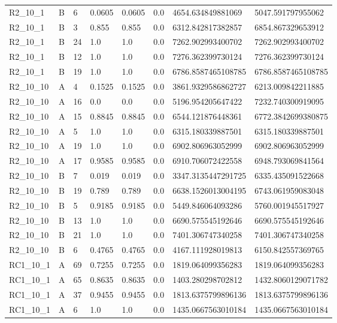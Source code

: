 \begin{tabular}{llllllll}
 R2\_10\_1 & B & 6 & 0.0605 & 0.0605 & 0.0 & 4654.634849881069 & 5047.591797955062 \\
 R2\_10\_1 & B & 3 & 0.855 & 0.855 & 0.0 & 6312.842817382857 & 6854.867329653912 \\
 R2\_10\_1 & B & 24 & 1.0 & 1.0 & 0.0 & 7262.902993400702 & 7262.902993400702 \\
 R2\_10\_1 & B & 12 & 1.0 & 1.0 & 0.0 & 7276.362399730124 & 7276.362399730124 \\
 R2\_10\_1 & B & 19 & 1.0 & 1.0 & 0.0 & 6786.8587465108785 & 6786.8587465108785 \\
 R2\_10\_10 & A & 4 & 0.1525 & 0.1525 & 0.0 & 3861.9329586862727 & 6213.009842211885 \\
 R2\_10\_10 & A & 16 & 0.0 & 0.0 & 0.0 & 5196.954205647422 & 7232.740300919095 \\
 R2\_10\_10 & A & 15 & 0.8845 & 0.8845 & 0.0 & 6544.121876448361 & 6772.3842699380875 \\
 R2\_10\_10 & A & 5 & 1.0 & 1.0 & 0.0 & 6315.180339887501 & 6315.180339887501 \\
 R2\_10\_10 & A & 19 & 1.0 & 1.0 & 0.0 & 6902.806963052999 & 6902.806963052999 \\
 R2\_10\_10 & A & 17 & 0.9585 & 0.9585 & 0.0 & 6910.706072422558 & 6948.793069841564 \\
 R2\_10\_10 & B & 7 & 0.019 & 0.019 & 0.0 & 3347.3135447291725 & 6335.435091522668 \\
 R2\_10\_10 & B & 19 & 0.789 & 0.789 & 0.0 & 6638.1526013004195 & 6743.061959083048 \\
 R2\_10\_10 & B & 5 & 0.9185 & 0.9185 & 0.0 & 5449.846064093286 & 5760.001945517927 \\
 R2\_10\_10 & B & 13 & 1.0 & 1.0 & 0.0 & 6690.575545192646 & 6690.575545192646 \\
 R2\_10\_10 & B & 21 & 1.0 & 1.0 & 0.0 & 7401.306747340258 & 7401.306747340258 \\
 R2\_10\_10 & B & 6 & 0.4765 & 0.4765 & 0.0 & 4167.111928019813 & 6150.842557369765 \\
 RC1\_10\_1 & A & 69 & 0.7255 & 0.7255 & 0.0 & 1819.064099356283 & 1819.064099356283 \\
 RC1\_10\_1 & A & 65 & 0.8635 & 0.8635 & 0.0 & 1403.280298702812 & 1432.8060129071782 \\
 RC1\_10\_1 & A & 37 & 0.9455 & 0.9455 & 0.0 & 1813.6375799896136 & 1813.6375799896136 \\
 RC1\_10\_1 & A & 6 & 1.0 & 1.0 & 0.0 & 1435.0667563010184 & 1435.0667563010184 \\

\end{tabular}
